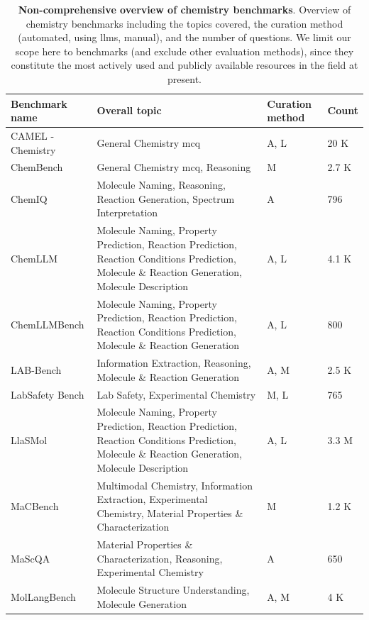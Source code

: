 \begin{table}
\centering
\footnotesize
\caption{\textbf{Non-comprehensive overview of chemistry benchmarks}. Overview of chemistry benchmarks including the topics covered, the curation method (automated, using \glspl{llm}, manual), and the number of questions. We limit our scope here to benchmarks (and exclude other evaluation methods), since they constitute the most actively used and publicly available resources in the field at present.}
\label{tab:chemistry_benchmarks}
\begin{tabular}{p{3cm} p{6.9cm} p{1.2cm} p{1cm}}
\toprule
\textbf{Benchmark name} & \textbf{Overall topic} & \textbf{Curation method} & \textbf{Count} \\
\midrule
CAMEL - Chemistry \autocite{li2023camel} & General Chemistry \gls{mcq} & A, L & 20 K \\
ChemBench \autocite{mirza2024large} & General Chemistry \gls{mcq}, Reasoning & M & 2.7 K \\
ChemIQ \autocite{runcie2025assessing} & Molecule Naming, Reasoning, Reaction Generation, Spectrum Interpretation & A & 796 \\
ChemLLM \autocite{zhang2024chemllm} & Molecule Naming, Property Prediction, Reaction Prediction, Reaction Conditions Prediction, Molecule \& Reaction Generation, Molecule Description & A, L & 4.1 K \\
ChemLLMBench \autocite{guo2023large} & Molecule Naming, Property Prediction, Reaction Prediction, Reaction Conditions Prediction, Molecule \& Reaction Generation & A, L & 800 \\
LAB-Bench \autocite{laurent2024lab0bench0} & Information Extraction, Reasoning, Molecule \& Reaction Generation & A, M & 2.5 K \\
LabSafety Bench \autocite{zhou2024labsafety} & Lab Safety, Experimental Chemistry & M, L & 765 \\
LlaSMol \autocite{yu2024llasmol} & Molecule Naming, Property Prediction, Reaction Prediction, Reaction Conditions Prediction, Molecule \& Reaction Generation, Molecule Description & A, L & 3.3 M \\
MaCBench \autocite{alampara2024probing} & Multimodal Chemistry, Information Extraction, Experimental Chemistry, Material Properties \& Characterization & M & 1.2 K \\
MaScQA \autocite{zaki2023mascqa0} & Material Properties \& Characterization, Reasoning, Experimental Chemistry & A & 650 \\
MolLangBench \autocite{cai2025mollangbench} & Molecule Structure Understanding, Molecule Generation & A, M & 4 K\\

\end{tabular}
\end{table}

